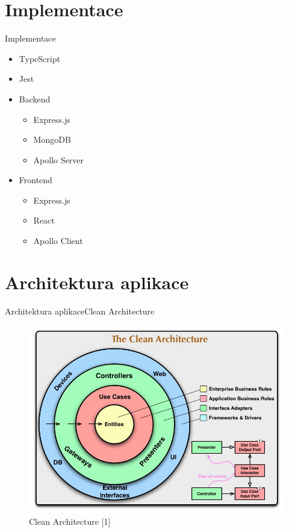 \documentclass[czech,aspectratio=169]{beamer}
\begin{document}
\section{Implementace}
\begin{frame}{Implementace}
    \begin{itemize}
        \item TypeScript
        \item Jest
        \item Backend
              \begin{itemize}
                  \item Express.js
                  \item MongoDB
                  \item Apollo Server
              \end{itemize}
        \item Frontend
              \begin{itemize}
                  \item Express.js
                  \item React
                  \item Apollo Client
              \end{itemize}
    \end{itemize}
\end{frame}

\section{Architektura aplikace}
\begin{frame}{Architektura aplikace}{Clean Architecture}
    \begin{figure}
        \centering
        \includegraphics[width=.5\textwidth]{assets/clean_architecture.jpg}
        \caption{Clean Architecture [1]}
        \label{fig:clean_architecture}
    \end{figure}
\end{frame}
\end{document}
